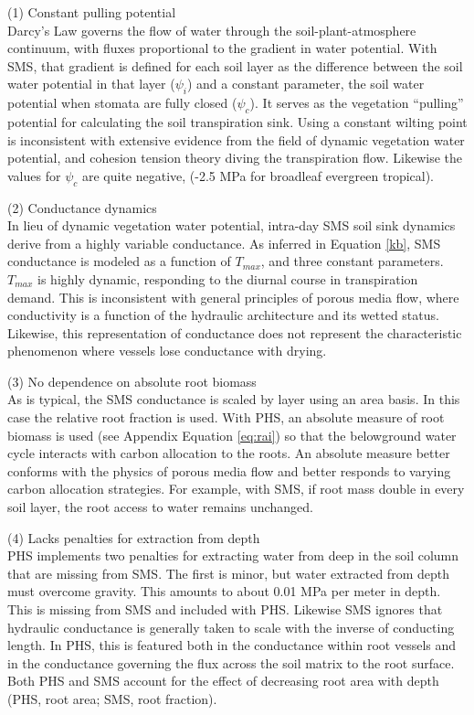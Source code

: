 \documentclass[draft,linenumbers]{agujournal}
\begin{document}
    (1) Constant pulling potential \\
    Darcy's Law governs the flow of water through the soil-plant-atmosphere continuum, 
    with fluxes proportional to the gradient in water potential. 
    With SMS, that gradient is defined for each soil layer as 
    the difference between the soil water potential in that layer ($\psi_i$) 
    and a constant parameter, the soil water potential when stomata are fully closed ($\psi_{c}$).
    It serves as the vegetation ``pulling'' potential for calculating the soil transpiration sink.
    Using a constant wilting point is inconsistent with extensive evidence from the field of dynamic vegetation water potential, and cohesion tension theory diving the transpiration flow.
    Likewise the values for $\psi_{c}$ are quite negative, (-2.5 MPa for broadleaf evergreen tropical). 
    
    (2) Conductance dynamics \\
    In lieu of dynamic vegetation water potential, intra-day SMS soil sink dynamics derive from a highly variable conductance.
    As inferred in Equation \ref{kb}, SMS conductance is modeled as a function of $T_{max}$, and three constant parameters.
    $T_{max}$ is highly dynamic, responding to the diurnal course in transpiration demand.
    This is inconsistent with general principles of porous media flow, where conductivity is a function of the hydraulic architecture and its wetted status.
    Likewise, this representation of conductance does not represent the characteristic phenomenon where vessels lose conductance with drying.
      
    (3) No dependence on absolute root biomass \\
    As is typical, the SMS conductance is scaled by layer using an area basis.
    In this case the relative root fraction is used.
    With PHS, an absolute measure of root biomass is used (see Appendix Equation \ref{eq:rai}) so that the belowground water cycle interacts with carbon allocation to the roots.
    An absolute measure better conforms with the physics of porous media flow and better responds to varying carbon allocation strategies.
    For example, with SMS, if root mass double in every soil layer, the root access to water remains unchanged.

    (4) Lacks penalties for extraction from depth \\
    PHS implements two penalties for extracting water from deep in the soil column that are missing from SMS.
    The first is minor, but water extracted from depth must overcome gravity. 
    This amounts to about 0.01 MPa per meter in depth. 
    This is missing from SMS and included with PHS. 
    Likewise SMS ignores that hydraulic conductance is generally taken to scale with the inverse of conducting length.
    In PHS, this is featured both in the conductance within root vessels and 
    in the conductance governing the flux across the soil matrix to the root surface.
    Both PHS and SMS account for the effect of decreasing root area with depth (PHS, root area; SMS, root fraction).
    
\end{document}
